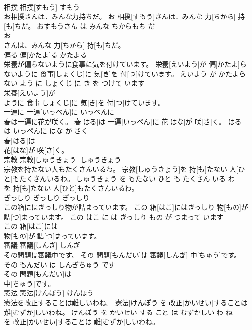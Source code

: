 \documentclass[8pt]{extreport}
\begin{document}
\begin{CJK}{UTF8}{min}
\\	相撲	相撲[すもう]	すもう	
\\	お相撲さんは、みんな力持ちだ。	お 相撲[すもう]さんは、みんな 力[ちから] 持[も]ちだ。	おすもうさん は みんな ちからもち だ	
\\	お
\\	さんは、みんな 力[ちから] 持[も]ちだ。			
\\	偏る	偏[かたよ]る	かたよる	
\\	栄養が偏らないように食事に気を付けています。	栄養[えいよう]が 偏[かたよ]らないように 食事[しょくじ]に 気[き]を 付[つ]けています。	えいよう が かたよらない よう に しょくじ に き を つけて います	
\\	栄養[えいよう]が
\\	ように 食事[しょくじ]に 気[き]を 付[つ]けています。			
\\	一遍に	一遍[いっぺん]に	いっぺんに	
\\	春は一遍に花が咲く。	春[はる]は 一遍[いっぺん]に 花[はな]が 咲[さ]く。	はる は いっぺんに はな が さく	
\\	春[はる]は
\\	花[はな]が 咲[さ]く。			
\\	宗教	宗教[しゅうきょう]	しゅうきょう	
\\	宗教を持たない人もたくさんいるわ。	宗教[しゅうきょう]を 持[も]たない 人[ひと]もたくさんいるわ。	しゅうきょう を もたない ひと も たくさん いる わ	
\\	を 持[も]たない 人[ひと]もたくさんいるわ。			
\\	ぎっしり	ぎっしり	ぎっしり	
\\	この箱にはぎっしり物が詰まっています。	この 箱[はこ]にはぎっしり 物[もの]が 詰[つ]まっています。	この はこ に は ぎっしり もの が つまって います	
\\	この 箱[はこ]には
\\	物[もの]が 詰[つ]まっています。			
\\	審議	審議[しんぎ]	しんぎ	
\\	その問題は審議中です。	その 問題[もんだい]は 審議[しんぎ] 中[ちゅう]です。	その もんだい は しんぎちゅう です	
\\	その 問題[もんだい]は
\\	中[ちゅう]です。			
\\	憲法	憲法[けんぽう]	けんぽう	
\\	憲法を改正することは難しいわね。	憲法[けんぽう]を 改正[かいせい]することは 難[むずか]しいわね。	けんぽう を かいせい する こと は むずかしい わ ね	
\\	を 改正[かいせい]することは 難[むずか]しいわね。			

\end{CJK}
\end{document}
